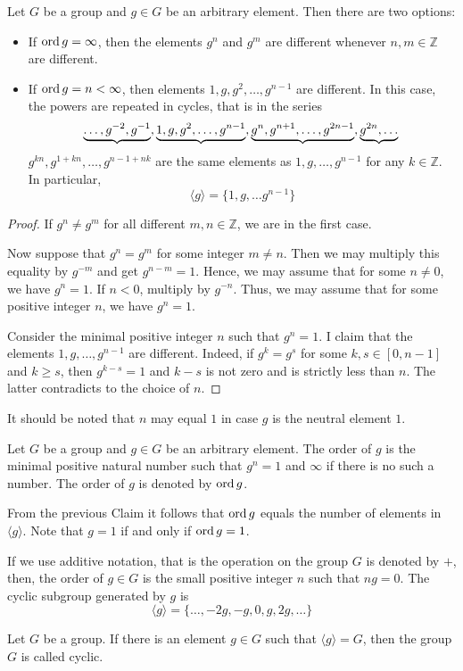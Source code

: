 \begin{claim}
\label{claim::CyclicClass}
Let $G$ be a group and $g\in G$ be an arbitrary element.
Then there are two options:
\begin{itemize}
\item If $\operatorname{ord} g = \infty$, then the elements $g^n$ and $g^m$ are different whenever $n,m\in\mathbb Z$ are different.

\item If $\operatorname{ord} g = n < \infty$, then elements $1, g, g^2, \ldots, g^{n-1}$ are different.
In this case, the powers are repeated in cycles, that is in the series 
\[
\underbrace{\ldots, g^{-2},g^{-1}},\underbrace{1, g, g^2, \ldots, g^{n-1}}, \underbrace{g^n, g^{n+1},\ldots,g^{2n - 1}}, \underbrace{g^{2n},\ldots}\\
\]
$g^{kn}, g^{1 + kn}, \ldots, g^{n-1 + nk}$ are the same elements as $1, g, \ldots, g^{n-1}$ for any $k\in \mathbb Z$.
In particular, 
\[
\langle g\rangle =\{1,g,\ldots g^{n-1}\}
\]
\end{itemize}
\end{claim}
\begin{proof}
If $g^n\neq g^m$ for all different $m,n\in \mathbb Z$, we are in the first case.

Now suppose that $g^n = g^m$ for some integer $m\neq n$.
Then we may multiply this equality by $g^{-m}$ and get $g^{n-m} = 1$.
Hence, we may assume that for some $n \neq 0$, we have $g^n = 1$.
If $n < 0$, multiply by $g^{-n}$.
Thus, we may assume that for some positive integer $n$, we have $g^n = 1$.

Consider the minimal positive integer $n$ such that $g^n = 1$.
I claim that the elements $1, g, \ldots, g^{n-1}$ are different.
Indeed, if $g^k = g^s$ for some $k,s \in [0, n-1]$ and $k \geqslant s$, then $g^{k-s} = 1$ and $k - s$ is not zero and is strictly less than $n$.
The latter contradicts to the choice of $n$.
\end{proof}

It should be noted that $n$ may equal $1$ in case $g$ is the neutral element $1$.

\begin{definition}
Let $G$ be a group and $g\in G$ be an arbitrary element.
The order of $g$ is the minimal positive natural number such that $g^n = 1$ and $\infty$ if there is no such a number.
The order of $g$ is denoted by $\operatorname{ord} g$.
\end{definition}

From the previous Claim it follows that $\operatorname{ord} g$ equals the number of elements in $\langle g\rangle$.
Note that $g  = 1$ if and only if $\operatorname{ord} g = 1$.

If we use additive notation, that is the operation on the group $G$ is denoted by $+$, then, the order of $g\in G$ is the small positive integer $n$ such that $ng = 0$.
The cyclic subgroup generated by $g$ is
\[
\langle g\rangle = \{\ldots, -2 g, - g , 0, g, 2g, \ldots\}
\]

\begin{definition}
Let $G$ be a group.
If there is an element $g\in G$ such that $\langle g\rangle = G$, then the group $G$ is called cyclic.
\end{definition}
